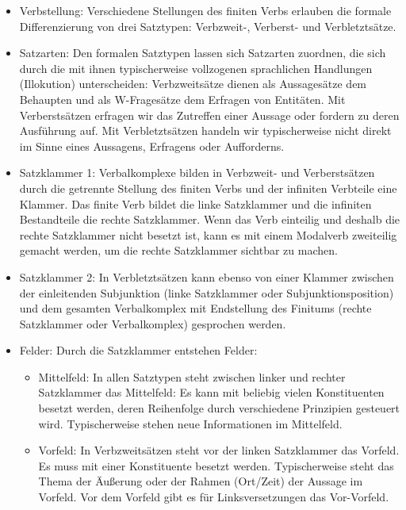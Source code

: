 \begin{itemize}

\item Verbstellung: Verschiedene Stellungen des finiten Verbs erlauben die formale Differenzierung von drei Satztypen: Verbzweit-, Verberst- und Verbletztsätze.  

\item Satzarten: Den formalen Satztypen lassen sich Satzarten zuordnen, die sich durch die mit ihnen typischerweise vollzogenen sprachlichen Handlungen (Illokution) unterscheiden: Verbzweitsätze dienen als Aussagesätze dem Behaupten und als W-Fragesätze dem Erfragen von Entitäten. Mit Verberstsätzen erfragen wir das Zutreffen einer Aussage oder fordern zu deren Ausführung auf. Mit Verbletztsätzen handeln wir typischerweise nicht direkt im Sinne eines Aussagens, Erfragens oder Aufforderns.   

\item Satzklammer 1: Verbalkomplexe bilden in Verbzweit- und Verberstsätzen durch die getrennte Stellung des finiten Verbs und der infiniten Verbteile eine Klammer. Das finite Verb bildet die linke Satzklammer und die infiniten Bestandteile die rechte Satzklammer. Wenn das Verb einteilig und deshalb die rechte Satzklammer nicht besetzt ist, kann es \zB mit einem Modalverb zweiteilig gemacht werden, um die rechte Satzklammer sichtbar zu machen.

\item Satzklammer 2: In Verbletztsätzen kann ebenso von einer Klammer zwischen der einleitenden Subjunktion (linke Satzklammer oder Subjunktionsposition) und dem gesamten Verbalkomplex mit Endstellung des Finitums (rechte Satzklammer oder Verbalkomplex) gesprochen werden. 

\item Felder: Durch die Satzklammer entstehen Felder: 

\begin{itemize}

\item Mittelfeld: In allen Satztypen steht zwischen linker und rechter Satzklammer das Mittelfeld: Es kann mit beliebig vielen Konstituenten besetzt werden, deren Reihenfolge durch verschiedene Prinzipien gesteuert wird. Typischerweise stehen neue Informationen im Mittelfeld.

\item Vorfeld: In Verbzweitsätzen steht vor der linken Satzklammer das Vorfeld. Es muss mit einer Konstituente besetzt werden. Typischerweise steht das Thema der Äußerung oder der Rahmen (Ort/Zeit) der Aussage im Vorfeld. Vor dem Vorfeld gibt es für Linksversetzungen das Vor-Vorfeld. 


\end{itemize}
\end{itemize}
